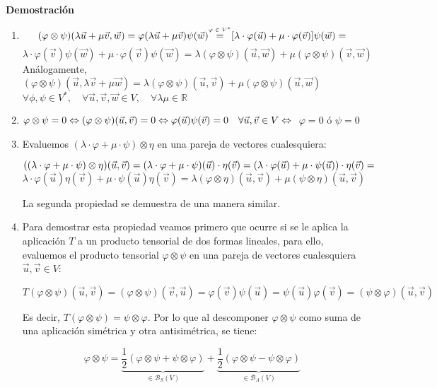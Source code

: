 \documentclass[x11names,table]{report}
\begin{document}
\textbf{Demostración}
\begin{enumerate}
\item 
\[(\varphi\otimes\psi)(\lambda\vec{u}+\mu\vec{v},\vec{w})=\varphi(\lambda\vec{u}+\mu\vec{v})\psi(\vec{w})\shortstack{{\tiny{$\varphi\in V^*$}}\\=}[\lambda\cdot\varphi(\vec{u})+\mu\cdot\varphi(\vec{v})]\psi(\vec{w})=\]
\[\lambda\cdot\varphi(\vec{v})\psi(\vec{w})+\mu\cdot\varphi(\vec{v})\psi(\vec{w})=\lambda(\varphi\otimes\psi)(\vec{u},\vec{w})+\mu(\varphi\otimes\psi)(\vec{v},\vec{w})\]
Análogamente, $(\varphi\otimes\psi)(\vec{u},\lambda\vec{v}+\mu \vec{w})=\lambda(\varphi\otimes\psi)(\vec{u},\vec{v})+\mu(\varphi\otimes\psi)(\vec{u},\vec{w})$
\(\forall \phi,\psi\in V^*,\quad\forall\vec{u},\vec{v},\vec{w}\in V,\quad \forall\lambda\mu\in\mathbb{R}\)
\item
\(\varphi\otimes\psi=0\Leftrightarrow(\varphi\otimes\psi)(\vec{u},\vec{v})=0\Leftrightarrow\varphi(\vec{u})\psi(\vec{v})=0\quad \forall \vec{u},\vec{v}\in V\Leftrightarrow\\\)
\(\varphi=0\text{ ó }\psi=0\)
\item Evaluemos $(\lambda\cdot\varphi+\mu\cdot\psi)\otimes\eta$ en una pareja de vectores cualesquiera:

\(((\lambda\cdot\varphi+\mu\cdot\psi)\otimes\eta)(\vec{u},\vec{v})=(\lambda\cdot\varphi+\mu\cdot\psi)(\vec{u})\cdot\eta(\vec{v})=(\lambda\cdot\varphi(\vec{u})+\mu\cdot\psi(\vec{u}))\cdot\eta(\vec{v})=\\\)
\(\lambda\cdot\varphi(\vec{u})\eta(\vec{v})+\mu\cdot\psi(\vec{u})\eta(\vec{v})=\lambda(\varphi\otimes\eta)(\vec{u},\vec{v})+\mu (\psi\otimes\eta)(\vec{u},\vec{v})\)

La segunda propiedad se demuestra de una manera similar.
\item
Para demostrar esta propiedad veamos primero que ocurre si se le aplica la aplicación $T$ a un producto tensorial de dos formas lineales, para ello, evaluemos el producto tensorial $\varphi\otimes\psi$ en una pareja de vectores cualesquiera $\vec{u},\vec{v}\in V$:

\(T(\varphi\otimes\psi)(\vec{u},\vec{v})=(\varphi\otimes\psi)(\vec{v},\vec{u})=\varphi(\vec{v})\psi(\vec{u})=\psi(\vec{u})\varphi(\vec{v})=(\psi\otimes\varphi)(\vec{u},\vec{v})\)

Es decir, $T(\varphi\otimes\psi)=\psi\otimes\varphi$. Por lo que al descomponer $\varphi\otimes\psi$ como suma de una aplicación simétrica y otra antisimétrica, se tiene:

\[
\varphi\otimes\psi=\underbrace{\frac{1}{2}(\varphi\otimes\psi+\psi\otimes\varphi)}_{\in\mathcal{B}_S(V)}+\underbrace{\frac{1}{2}(\varphi\otimes\psi-\psi\otimes\varphi)}_{\in\mathcal{B}_A(V)}
\]


\end{enumerate}
\end{document}
